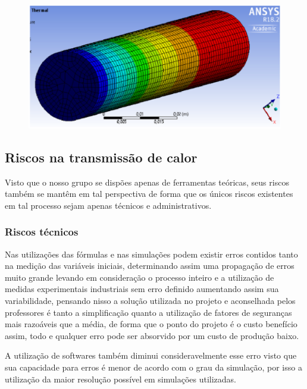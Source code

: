 \begin{figure}[!htb]                                                               
   \centering                                                                      
   \includegraphics[scale=0.5, keepaspectratio=true]{figuras/Resultado2.eps}                       
\end{figure}

\subsection{Riscos na transmissão de calor}

Visto que o nosso grupo se dispões apenas de ferramentas teóricas, seus riscos também se mantêm em tal perspectiva de forma que os únicos riscos existentes em tal processo sejam apenas técnicos e administrativos.

\subsubsection{Riscos técnicos}
Nas utilizações das fórmulas e nas simulações podem existir erros contidos tanto na medição das variáveis iniciais, determinando assim uma propagação de erros muito grande levando em consideração o processo inteiro e a utilização de medidas experimentais industriais sem erro definido aumentando assim sua variabilidade, pensando nisso a solução utilizada no projeto e aconselhada pelos professores é tanto a simplificação quanto a utilização de fatores de seguranças mais razoáveis que a média, de forma que o ponto do projeto é o custo benefício assim, todo e qualquer erro pode ser absorvido por um custo de produção baixo.

A utilização de softwares também diminui consideravelmente esse erro visto que sua capacidade para erros é menor de acordo com o grau da simulação, por isso a utilização da maior resolução possível em simulações utilizadas.

